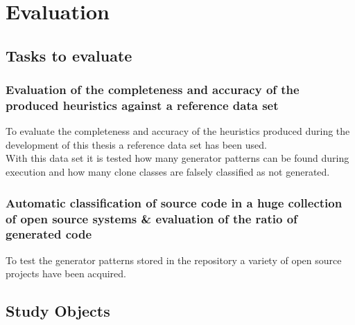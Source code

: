 
\chapter{Evaluation}\label{chapter:evaluation}
\section{Tasks to evaluate}

\subsection{Evaluation of the completeness and accuracy of the produced heuristics against a reference data set}
To evaluate the completeness and accuracy of the heuristics produced during the development of this thesis a reference data set has been used.\\
With this data set it is tested how many generator patterns can be found during execution and how many clone classes are falsely classified as not generated. \\

\subsection{Automatic classification of source code in a huge collection of open source systems \& evaluation of the ratio of generated code}
To test the generator patterns stored in the repository a variety of open source projects have been acquired.\\
\section{Study Objects}


